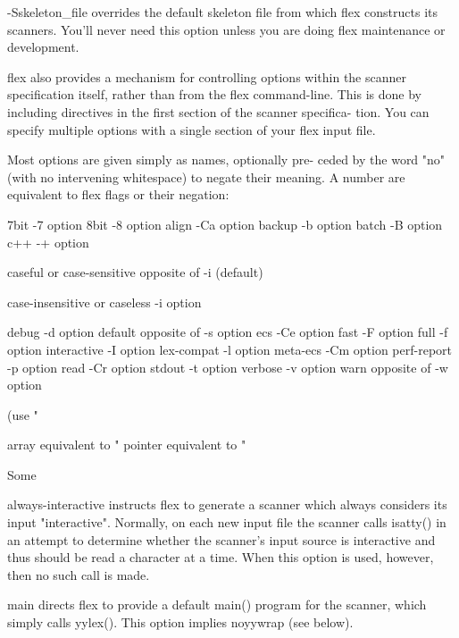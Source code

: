 \documentclass[12pt,spanish,twocolumn,lettersize]{article}
\begin{document}
{       -Sskeleton_file
	      overrides the default skeleton file from which flex
	      constructs its scanners.	You'll	never  need  this
	      option  unless  you  are	doing flex maintenance or
	      development.

       flex also provides a  mechanism	for  controlling  options
       within  the scanner specification itself, rather than from
       the flex command-line.  This is done by including  %
       directives  in the first section of the scanner specifica-
       tion.  You can specify  multiple	 options  with	a  single
       section of your flex input file.

       Most options are given simply as	 names,	 optionally  pre-
       ceded by the word "no" (with no intervening whitespace) to
       negate their meaning.  A number	are  equivalent	 to  flex
       flags or their negation:

	   7bit		   -7 option
	   8bit		   -8 option
	   align	   -Ca option
	   backup	   -b option
	   batch	   -B option
	   c++		   -+ option

	   caseful or
	   case-sensitive  opposite of -i (default)

	   case-insensitive or
	   caseless	   -i option

	   debug	   -d option
	   default	   opposite of -s option
	   ecs		   -Ce option
	   fast		   -F option
	   full		   -f option
	   interactive	   -I option
	   lex-compat	   -l option
	   meta-ecs	   -Cm option
	   perf-report	   -p option
	   read		   -Cr option
	   stdout	   -t option
	   verbose	   -v option
	   warn		   opposite of -w option

			   (use "%

	   array	   equivalent to "%
	   pointer	   equivalent to "%

       Some %

       always-interactive
	      instructs	 flex  to generate a scanner which always
	      considers its input  "interactive".   Normally,  on
	      each  new	 input file the scanner calls isatty() in
	      an attempt to determine whether the scanner's input
	      source  is  interactive  and  thus should be read a
	      character at a time.  When  this	option	is  used,
	      however, then no such call is made.

       main   directs  flex  to	 provide a default main() program
	      for the scanner, which simply calls yylex().   This
	      option implies noyywrap (see below).

}
\end{document}
